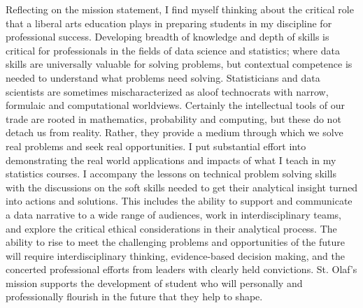 \documentclass[letterpaper,12pt]{article}\usepackage[]{graphicx}\usepackage[]{color}
\begin{document}
Reflecting on the mission statement, I find myself thinking about the critical role that a liberal arts education plays in preparing students in my discipline for professional success. Developing breadth of knowledge and depth of skills is critical for professionals in the fields of data science and statistics; where data skills are universally valuable for solving problems, but contextual competence is needed to understand what problems need solving. Statisticians and data scientists are sometimes mischaracterized as aloof technocrats with narrow, formulaic and computational worldviews. Certainly the intellectual tools of our trade are rooted in mathematics, probability and computing, but these do not detach us from reality. Rather, they provide a medium through which we solve real problems and seek real opportunities. I put substantial effort into demonstrating the real world applications and impacts of what I teach in my statistics courses. I accompany the lessons on technical problem solving skills with the discussions on the soft skills needed to get their analytical insight turned into actions and solutions. This includes the ability to support and communicate a data narrative to a wide range of audiences, work in interdisciplinary teams, and explore the critical ethical considerations in their analytical process. The ability to rise to meet the challenging problems and opportunities of the future will require interdisciplinary thinking, evidence-based decision making, and the concerted professional efforts from leaders with clearly held convictions. St. Olaf's mission supports the development of student who will personally and professionally flourish in the future that they help to shape. 
\end{document}
